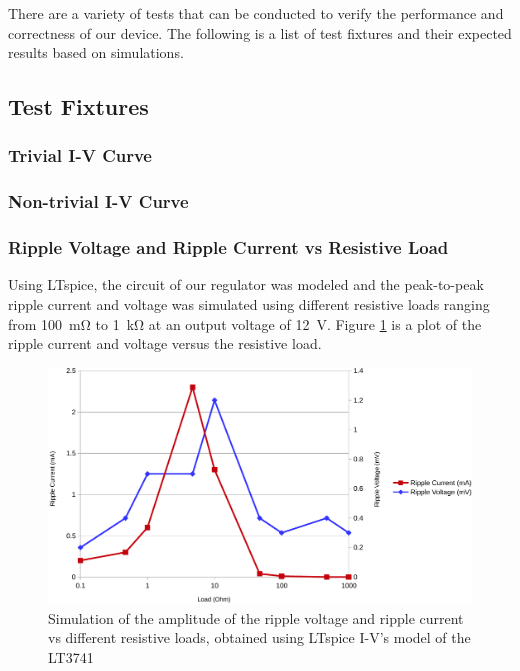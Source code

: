 There are a variety of tests that can be conducted to verify the performance and
correctness of our  device.  The  following is a list of test fixtures and their
expected results based on simulations.

\subsection{Test Fixtures}

\subsubsection{Trivial I-V Curve}

\subsubsection{Non-trivial I-V Curve}

\subsubsection{Ripple Voltage and Ripple Current vs Resistive Load}

Using LTspice\cite{ref:ltspice}, the circuit  of  our  regulator was modeled and
the  peak-to-peak  ripple  current  and  voltage  was  simulated using different
resistive  loads ranging from \SI{100}{\milli\ohm} to  \SI{1}{\kilo\ohm}  at  an
output  voltage of \SI{12}{\volt}. Figure \ref{fig:verification:ripple_sim} is a
plot  of  the   ripple   current   and   voltage   versus  the  resistive  load.

\begin{figure}[th!]
    \centering
    \includegraphics[width=.7\textwidth]{images/sim/ripple-vs-load.pdf}
    \caption{Simulation of the amplitude of the ripple voltage and ripple current vs different resistive loads, obtained using LTspice I-V's model of the LT3741}
    \label{fig:verification:ripple_sim}
\end{figure}

